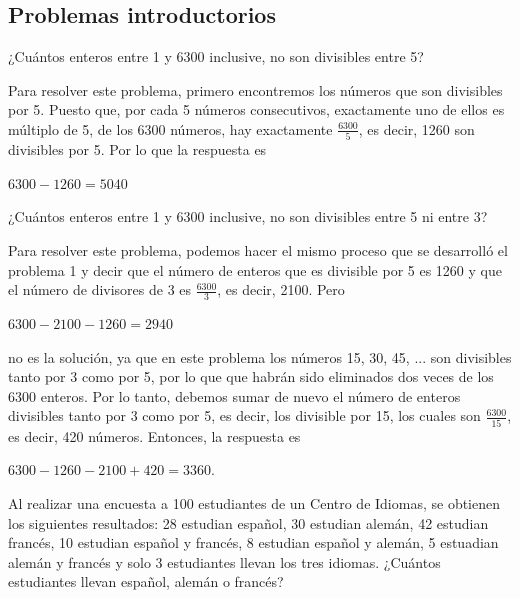 \documentclass[12pt]{article}
\begin{document}
\subsection{Problemas introductorios}

\begin{problema}
    ¿Cuántos enteros entre 1 y 6300 inclusive, no son divisibles entre 5?
\end{problema}

\begin{solucion}
    Para resolver este problema, primero encontremos los números que son divisibles por 5. Puesto que, por cada 5 números consecutivos, exactamente uno de ellos es múltiplo de 5, de los 6300 números, hay exactamente $\frac{6300}{5}$, es decir, 1260 son divisibles por 5. Por lo que la respuesta es

    \begin{center}
        $6300 - 1260 = 5040$
    \end{center}
\end{solucion}

\begin{problema}
    ¿Cuántos enteros entre 1 y 6300 inclusive, no son divisibles entre 5 ni entre 3?
\end{problema}

\begin{solucion}
    Para resolver este problema, podemos hacer el mismo proceso que se desarrolló el problema 1 y decir que el número de enteros que es divisible por 5 es 1260 y que el número de divisores de 3 es $\frac{6300}{3}$, es decir, 2100. Pero

    \begin{center}
        $6300-2100-1260 = 2940$
    \end{center}

    no es la solución, ya que en este problema los números 15, 30, 45, ... son divisibles tanto por 3 como por 5, por lo que que habrán sido eliminados dos veces de los 6300 enteros. Por lo tanto, debemos sumar de nuevo el número de enteros divisibles tanto por 3 como por 5, es decir, los divisible por 15, los cuales son $\frac{6300}{15}$, es decir, 420 números. Entonces, la respuesta es

    \begin{center}
        $6300-1260-2100 + 420 = 3360.$
    \end{center}
\end{solucion}

\begin{problema}
    Al realizar una encuesta a 100 estudiantes de un Centro de Idiomas, se obtienen los siguientes resultados:  28 estudian español, 30 estudian  alemán,  42  estudian  francés,  10  estudian  español  y  francés,  8 estudian  español  y  alemán,  5  estuadian  alemán  y  francés  y  solo  3 estudiantes llevan los tres idiomas. ¿Cuántos estudiantes llevan español, alemán o francés?
\end{problema}
\end{document}
